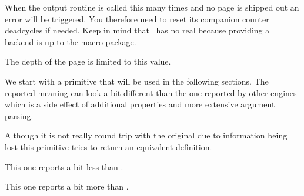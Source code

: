 \stopnewprimitive

\startoldprimitive[title={\prm {maxdeadcycles}}]

When the output routine is called this many times and no page is shipped out an
error will be triggered. You therefore need to reset its companion counter \prm
{deadcycles} if needed. Keep in mind that \LUAMETATEX\ has no real 
because providing a backend is up to the macro package.

\stopoldprimitive

\startoldprimitive[title={\prm {maxdepth}}]

The depth of the page is limited to this value.

\stopoldprimitive

\startoldprimitive[title={\prm {meaning}}]

We start with a primitive that will be used in the following sections. The
reported meaning can look a bit different than the one reported by other engines
which is a side effect of additional properties and more extensive argument
parsing.

\startbuffer
\tolerant\permanent\protected\gdef\foo[#1]#*[#2]{(#1)(#2)} \meaning\foo
\stopbuffer

\typebuffer \getbuffer \glet\foo\relax

\stopoldprimitive

\startnewprimitive[title={\prm {meaningasis}}]

Although it is not really round trip with the original due to information
being lost this primitive tries to return an equivalent definition.

\startbuffer
\tolerant\permanent\protected\gdef\foo[#1]#*[#2]{(#1)(#2)} \meaningasis\foo
\stopbuffer

\typebuffer \getbuffer \glet\foo\relax

\stopnewprimitive

\startnewprimitive[title={\prm {meaningful}}]

This one reports a bit less than .

\startbuffer
\tolerant\permanent\protected\gdef\foo[#1]#*[#2]{(#1)(#2)} \meaningful\foo
\stopbuffer

\typebuffer \getbuffer \let\gfoo\relax

\stopnewprimitive

\startnewprimitive[title={\prm {meaningfull}}]

This one reports a bit more than .

